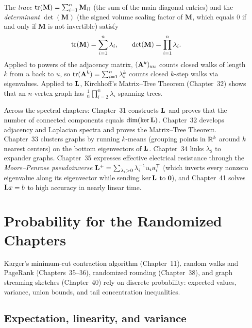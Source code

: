 \begin{example}
\label{ch42:ex-trace}
The \emph{trace} $\operatorname{tr}(\mathbf{M}) = \sum_{i=1}^n \mathbf{M}_{ii}$ (the sum of the main-diagonal entries) and the \emph{determinant} $\det(\mathbf{M})$ (the signed volume scaling factor of $\mathbf{M}$, which equals $0$ if and only if $\mathbf{M}$ is not invertible) satisfy
\[
  \operatorname{tr}(\mathbf{M}) = \sum_{i=1}^n \lambda_i, \qquad
  \det(\mathbf{M}) = \prod_{i=1}^n \lambda_i.
\]
Applied to powers of the adjacency matrix, $(\mathbf{A}^k)_{uu}$ counts closed walks of length $k$ from $u$ back to $u$, so $\operatorname{tr}(\mathbf{A}^k) = \sum_{i=1}^n \lambda_i^k$ counts closed $k$-step walks via eigenvalues. Applied to $\mathbf{L}$, Kirchhoff's Matrix--Tree Theorem (Chapter~32) shows that an $n$-vertex graph has $\frac{1}{n}\prod_{i=2}^n \lambda_i$ spanning trees.
\end{example}

\begin{connectionbox}
Across the spectral chapters: Chapter~31 constructs $\mathbf{L}$ and proves that the number of connected components equals $\dim(\ker\mathbf{L})$. Chapter~32 develops adjacency and Laplacian spectra and proves the Matrix--Tree Theorem. Chapter~33 clusters graphs by running $k$-means (grouping points in $\mathbb{R}^k$ around $k$ nearest centers) on the bottom eigenvectors of $\mathbf{L}$. Chapter~34 links $\lambda_2$ to expander graphs. Chapter~35 expresses effective electrical resistance through the \emph{Moore--Penrose pseudoinverse} $\mathbf{L}^+ = \sum_{\lambda_i > 0} \lambda_i^{-1} u_i u_i^\top$ (which inverts every nonzero eigenvalue along its eigenvector while sending $\ker\mathbf{L}$ to $\mathbf{0}$), and Chapter~41 solves $\mathbf{L} x = b$ to high accuracy in nearly linear time.
\end{connectionbox}

\section{Probability for the Randomized Chapters}
\label{ch42:probability}

Karger's minimum-cut contraction algorithm (Chapter~11), random walks and PageRank (Chapters~35--36), randomized rounding (Chapter~38), and graph streaming sketches (Chapter~40) rely on discrete probability: expected values, variance, union bounds, and tail concentration inequalities.

\subsection{Expectation, linearity, and variance}

